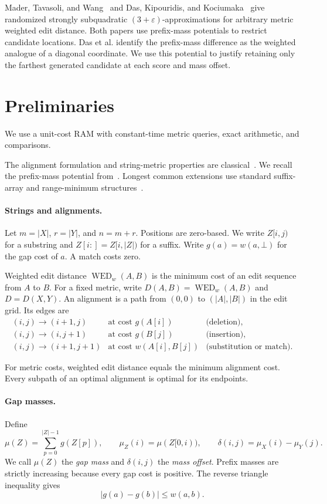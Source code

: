 \documentclass[11pt]{article}
\theoremstyle{remark}
\newcommand{\WED}{\operatorname{WED}}
\newcommand{\gap}{\bot}
\newcommand{\eps}{\varepsilon}
\begin{document}
Mader, Tavasoli, and Wang~\cite{MTW26} and Das, Kipouridis, and
Kociumaka~\cite{DKK26} give randomized strongly subquadratic
$(3+\eps)$-approximations for arbitrary metric weighted edit
distance. Both papers use prefix-mass potentials to restrict candidate
locations. Das et al. identify the prefix-mass difference as the weighted
analogue of a diagonal coordinate. We use this potential to justify
retaining only the farthest generated candidate at each score and mass
offset.

\section{Preliminaries}\label{sec:preliminaries}

\label{sec:model}
We use a unit-cost RAM with constant-time metric queries, exact
arithmetic, and comparisons.

The alignment formulation and string-metric properties are
classical~\cite{WF74,Sel74}. We recall the prefix-mass potential
from~\cite{MTW26,DKK26}. Longest common
extensions use standard suffix-array and range-minimum
structures~\cite{KSB06,BF00}.

\paragraph{Strings and alignments.}
Let $m=|X|$, $r=|Y|$, and $n=m+r$.
Positions are zero-based. We write $Z[i,j)$ for a substring and
$Z[i:]=Z[i,|Z|)$ for a suffix. Write $g(a)=w(a,\gap)$ for the gap cost of $a$.
A match costs zero.

Weighted edit distance $\WED_w(A,B)$ is the minimum cost of an edit
sequence from $A$ to $B$. For a fixed metric, write
$D(A,B)=\WED_w(A,B)$ and $D=D(X,Y)$.
An alignment is a path from $(0,0)$ to $(|A|,|B|)$ in the edit grid.
Its edges are
\[
\begin{array}{lll}
 (i,j)\longrightarrow(i+1,j)
   &\text{at cost }g(A[i])&\text{(deletion)},\\
 (i,j)\longrightarrow(i,j+1)
   &\text{at cost }g(B[j])&\text{(insertion)},\\
 (i,j)\longrightarrow(i+1,j+1)
   &\text{at cost }w(A[i],B[j])&\text{(substitution or match)}.
\end{array}
\]

For metric costs, weighted edit distance equals the minimum alignment
cost.
Every subpath of an optimal alignment is optimal for its endpoints.

\paragraph{Gap masses.}
Define
\[
 \mu(Z)=\sum_{p=0}^{|Z|-1}g(Z[p]),\qquad
 \mu_Z(i)=\mu(Z[0,i)),\qquad
 \delta(i,j)=\mu_X(i)-\mu_Y(j).
\]
We call $\mu(Z)$ the \emph{gap mass} and $\delta(i,j)$ the
\emph{mass offset}. Prefix masses are strictly increasing because
every gap cost is positive.
The reverse triangle inequality gives
\begin{equation}\label{eq:gap-inequalities}
 |g(a)-g(b)|\le w(a,b).
\end{equation}
\end{document}
